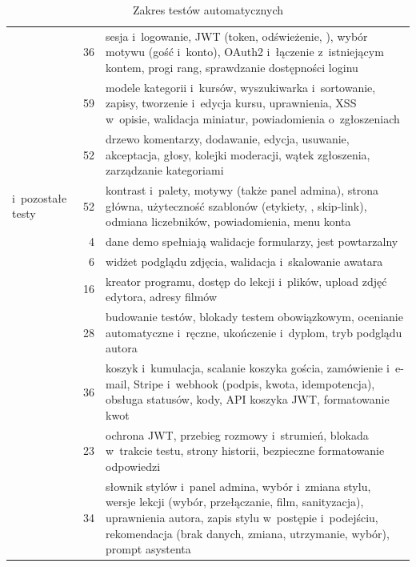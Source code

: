 \begin{table}[H]
\centering\small
\caption{Zakres testów automatycznych}\label{tab:testy}
\begin{tabularx}{\linewidth}{@{}P{4.2cm}rL@{}}
\toprule
{} &  &  \\
\midrule
{} & 36 & sesja i~logowanie, JWT (token, odświeżenie, ), wybór motywu (gość i~konto), OAuth2 i~łączenie z~istniejącym kontem, progi rang, sprawdzanie dostępności loginu \\
 & 59 & modele kategorii i~kursów, wyszukiwarka i~sortowanie, zapisy, tworzenie i~edycja kursu, uprawnienia, XSS w~opisie, walidacja miniatur, powiadomienia o~zgłoszeniach \\
 & 52 & drzewo komentarzy, dodawanie, edycja, usuwanie, akceptacja, głosy, kolejki moderacji, wątek zgłoszenia, zarządzanie kategoriami \\
 i~pozostałe testy  & 52 & kontrast i~palety, motywy (także panel admina), strona główna, użyteczność szablonów (etykiety, , skip-link), odmiana liczebników, powiadomienia, menu konta \\
 & 4 & dane demo spełniają walidacje formularzy,  jest powtarzalny \\
 & 6 & widżet podglądu zdjęcia, walidacja i~skalowanie awatara \\
 & 16 & kreator programu, dostęp do lekcji i~plików, upload zdjęć edytora, adresy filmów \\
 & 28 & budowanie testów, blokady testem obowiązkowym, ocenianie automatyczne i~ręczne, ukończenie i~dyplom, tryb podglądu autora \\
 & 36 & koszyk i~kumulacja, scalanie koszyka gościa, zamówienie i~e-mail, Stripe i~webhook (podpis, kwota, idempotencja), obsługa statusów, kody, API koszyka JWT, formatowanie kwot \\
 & 23 & ochrona JWT, przebieg rozmowy i~strumień, blokada w~trakcie testu, strony historii, bezpieczne formatowanie odpowiedzi \\
 & 34 & słownik stylów i~panel admina, wybór i~zmiana stylu, wersje lekcji (wybór, przełączanie, film, sanityzacja), uprawnienia autora, zapis stylu w~postępie i~podejściu, rekomendacja (brak danych, zmiana, utrzymanie, wybór), prompt asystenta \\

\end{tabularx}
\end{table}
